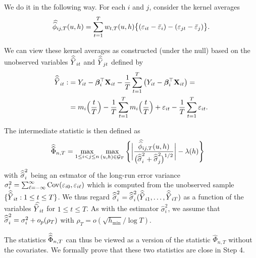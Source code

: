 We do it in the following way. For each $i$ and $j$, consider the kernel averages
\[\doublehat{\phi}_{ij,T}(u,h) = \sum_{t=1}^T w_{t,T}(u,h) \big\{ (\varepsilon_{it} - \bar{\varepsilon}_i) - (\varepsilon_{jt} - \bar{\varepsilon}_j)  \big\}. \]

We can view these kernel averages as constructed (under the null) based on the unobserved variables $\widehat{\widehat{Y}}_{it}$ and  $\widehat{\widehat{Y}}_{jt}$ defined by 
\begin{align*}
\widehat{\widehat{Y}}_{it} :&= Y_{it} - \bm{\beta}_i^\top \mathbf{X}_{it} -  \frac{1}{T}\sum_{t=1}^T \big(Y_{it} - \bm{\beta}_i^\top \mathbf{X}_{it}\big) =\\
&=m_i \Big( \frac{t}{T} \Big)  - \frac{1}{T}\sum_{t=1}^T  m_i \Big( \frac{t}{T} \Big) + \varepsilon_{it} - \frac{1}{T}\sum_{t=1}^T \varepsilon_{it}.
\end{align*}

The intermediate statistic is then defined as 
\begin{align}\label{eqA:Phi_doublehat}
\doublehattwo{\Phi}_{n,T} &= \max_{1 \le i < j \le n}\max_{(u,h) \in \mathcal{G}_T} \Bigg\{\bigg|\frac{\doublehat{\phi}_{ij,T}(u,h)}{\big(\doublehattwo{\sigma}_i^2 + \doublehattwo{\sigma}_j^2\big)^{1/2}}\bigg| - \lambda(h)\Bigg\}
\end{align}
with $\widehat{\widehat{\sigma}}_i^2$ being an estmator of the long-run error variance $\sigma_i^2 = \sum\nolimits_{\ell=-\infty}^{\infty} \textnormal{Cov}(\varepsilon_{i0}, \varepsilon_{i\ell})$ which is computed from the unobserved sample $\{ \widehat{\widehat{Y}}_{it} : 1 \le t \le T \}$. We thus regard $\widehat{\widehat{\sigma}}_i^2 = \widehat{\widehat{\sigma}}_i^2(\widehat{\widehat{Y}}_{i1},\ldots,\widehat{\widehat{Y}}_{iT})$ as a function of the variables $\doublehat{Y}_{it}$ for $1 \le t \le T$. As with the estimator $\widehat{\sigma}_i^2$, we assume that $\widehat{\widehat{\sigma}}_i^2 = \sigma_i^2 + o_p(\rho_T)$ with $\rho_T = o(\sqrt{h_{\min}}/\log T)$. 

The statistics $\widehat{\widehat{\Phi}}_{n,T}$ can thus be viewed as a version of the statistic $\widehat{\Phi}_{n,T}$ without the covariates. We formally prove that these two statistics are close in Step 4.

